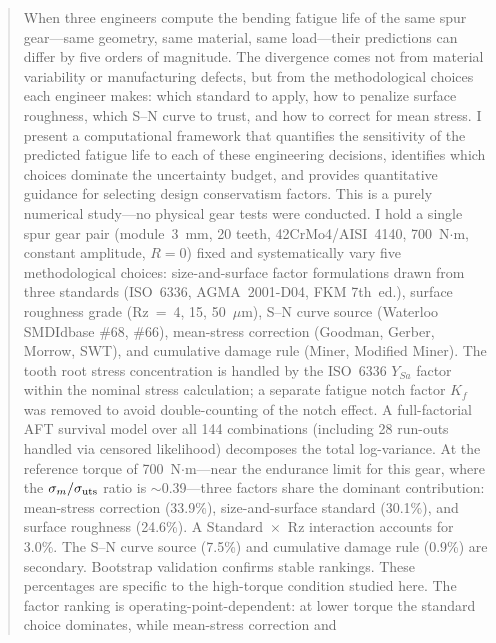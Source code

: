 \documentclass[12pt,a4paper]{article}
\begin{document}
\begin{abstract}
\label{sec:abstract}

When three engineers compute the bending fatigue life of the same spur
gear---same geometry, same material, same load---their predictions can
differ by five orders of magnitude. The divergence comes not from
material variability or manufacturing defects, but from the
methodological choices each engineer makes: which standard to apply, how
to penalize surface roughness, which S--N curve to trust, and how to
correct for mean stress. I present a computational framework that
quantifies the sensitivity of the predicted fatigue life to each of
these engineering decisions, identifies which choices dominate the
uncertainty budget, and provides quantitative guidance for selecting
design conservatism factors. This is a purely numerical study---no
physical gear tests were conducted. I hold a single spur gear pair
(module~3~mm,%
20 teeth,%
42CrMo4/AISI~4140,%
700~N$\cdot$m,%
constant amplitude, $R=0$) fixed and systematically vary five methodological%
choices: size-and-surface factor formulations drawn from three standards
(ISO~6336, AGMA~2001-D04, FKM 7th~ed.), surface
roughness grade (Rz~=~4, 15, 50~$\mu$m), S--N curve source (Waterloo
SMDIdbase \#68, \#66), mean-stress correction (Goodman, Gerber, Morrow,
SWT), and cumulative damage rule (Miner, Modified Miner). The tooth
root stress concentration is handled by the ISO~6336 $Y_{Sa}$ factor
within the nominal stress calculation; a separate fatigue notch factor
$K_f$ was removed to avoid double-counting of the notch effect. A
full-factorial AFT survival model over all 144 combinations (including
28 run-outs handled via censored likelihood) decomposes the total
log-variance. At the reference torque of 700~N$\cdot$m---near the
endurance limit for this gear, where the $\sigma_m/\sigma_{\rm uts}$
ratio is $\sim$0.39---three factors share the dominant contribution:
mean-stress correction (33.9\%), size-and-surface standard (30.1\%), and
surface roughness (24.6\%). A Standard~$\times$~Rz interaction accounts
for 3.0\%. The S--N curve source (7.5\%) and cumulative damage rule
(0.9\%) are secondary. Bootstrap validation confirms stable
rankings.%
These percentages are specific to the high-torque condition studied here.
The factor ranking is operating-point-dependent: at lower torque
the standard choice dominates, while mean-stress correction and

\end{abstract}
\end{document}
